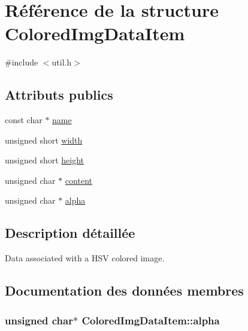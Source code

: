 \hypertarget{struct_colored_img_data_item}{}\section{Référence de la structure Colored\+Img\+Data\+Item}
\label{struct_colored_img_data_item}


{\ttfamily \#include $<$util.\+h$>$}

\subsection*{Attributs publics}
\begin{DoxyCompactItemize}
\item 
const char $\ast$ \hyperlink{struct_colored_img_data_item_afed2ef0f30516caf6b81a9d41033c8f3}{name}
\item 
unsigned short \hyperlink{struct_colored_img_data_item_aebc8ef167c7bbdf928fcc59b3c9d436b}{width}
\item 
unsigned short \hyperlink{struct_colored_img_data_item_acfac94346e3f7837df12c487bce866f2}{height}
\item 
unsigned char $\ast$ \hyperlink{struct_colored_img_data_item_a0f81eed6cfa6792cfa3d6bf9d4e40faa}{content}
\item 
unsigned char $\ast$ \hyperlink{struct_colored_img_data_item_ac40939426f6021e7da5677cc10160996}{alpha}
\end{DoxyCompactItemize}


\subsection{Description détaillée}
Data associated with a H\+S\+V colored image. 

\subsection{Documentation des données membres}
\hypertarget{struct_colored_img_data_item_ac40939426f6021e7da5677cc10160996}{}
\subsubsection[{alpha}]{\setlength{\rightskip}{0pt plus 5cm}unsigned char$\ast$ Colored\+Img\+Data\+Item\+::alpha}\label{struct_colored_img_data_item_ac40939426f6021e7da5677cc10160996}
\hypertarget{struct_colored_img_data_item_a0f81eed6cfa6792cfa3d6bf9d4e40faa}{}
